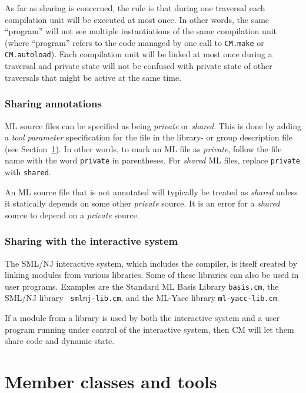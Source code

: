 \documentclass{article}
\begin{document}
As far as sharing is concerned, the rule is that during one traversal
each compilation unit will be executed at most once.  In other words,
the same ``program'' will not see multiple instantiations of the same
compilation unit (where ``program'' refers to the code managed by one
call to {\tt CM.make} or {\tt CM.autoload}).  Each compilation unit
will be linked at most once during a traversal and private state
will not be confused with private state of other traversals that might
be active at the same time.


\subsubsection*{Sharing annotations}

ML source files can be specified as being {\em private} or {\em
shared}.  This is done by adding a {\em tool parameter} specification
for the file in the library- or group description file (see
Section~\ref{sec:classes}).  In other words, to mark an ML file as
{\em private}, follow the file name with the word {\tt private} in
parentheses.  For {\em shared} ML files, replace {\tt private} with
{\tt shared}.

An ML source file that is not annotated will typically be treated as
{\em shared} unless it statically depends on some other {\em private}
source.  It is an error for a {\em shared} source to depend on a {\em
private} source.

\subsubsection*{Sharing with the interactive system}

The SML/NJ interactive system, which includes the compiler, is itself
created by linking modules from various libraries. Some of these
libraries can also be used in user programs.  Examples are the
Standard ML Basis Library {\tt basis.cm}, the SML/NJ library {\tt
smlnj-lib.cm}, and the ML-Yacc library {\tt ml-yacc-lib.cm}.

If a module from a library is used by both the interactive system and
a user program running under control of the interactive system, then
CM will let them share code and dynamic state.

\section{Member classes and tools}
\label{sec:classes}
\end{document}
